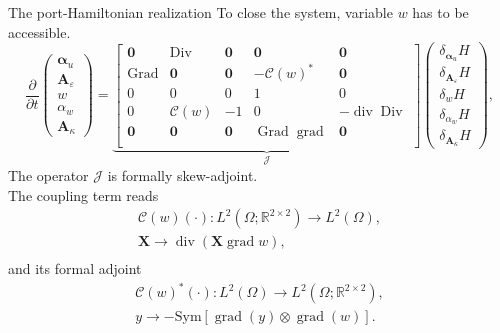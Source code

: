 \documentclass[aspectratio=169]{beamer}
\DeclareMathOperator*{\grad}{grad}
\DeclareMathOperator*{\Grad}{Grad}
\DeclareMathOperator*{\Div}{Div}
\renewcommand{\div}{\operatorname{div}}
\newcommand{\bbR}{\mathbb{R}}
\begin{document}
\begin{frame}{The port-Hamiltonian realization}
	To close the system, variable $w$ has to be accessible. 
	\begin{equation*}
	\frac{\partial}{\partial t}
	\begin{pmatrix}
		\bm{\alpha}_u \\
		\bm{A}_\varepsilon \\
		w \\
		\alpha_w \\
		\bm{A}_\kappa
	\end{pmatrix} = 
	\underbrace{\begin{bmatrix}
			\bm{0} & \Div & \bm{0} & \bm{0} & \bm{0}\\
			\Grad & \bm{0} & \bm{0} & -\mathcal{C}(w)^* & \bm{0} \\
			0 & 0 & 0 & 1 & 0 \\
			0 & \mathcal{C}(w) & -1 & 0 & -\div\Div \\
			\bm{0} & \bm{0} & \bm{0} & \Grad\grad & \bm{0} \\ 
	\end{bmatrix}}_{\mathcal{J}}
	\begin{pmatrix}
		\delta_{\bm\alpha_u} H \\
		\delta_{\bm{A}_\varepsilon} H \\
		\delta_{w} H \\
		\delta_{\alpha_w} H \\
		\delta_{\bm{A}_\kappa} H
	\end{pmatrix},
\end{equation*}
The operator $\mathcal{J}$ is formally skew-adjoint. \\
The coupling term reads
\begin{equation*}
	\begin{aligned}
		\mathcal{C}(w)(\cdot): L^2(\Omega; \bbR^{2\times 2}) \rightarrow L^2(\Omega), \\
								\bm{X}  \rightarrow \div( \bm{X} \grad w), \\
	\end{aligned} 
\end{equation*}
and its formal adjoint
\begin{equation*}
	\begin{aligned}
		\mathcal{C}(w)^*(\cdot): L^2(\Omega) \rightarrow L^2(\Omega; \bbR^{2\times 2}), \\
		y  \rightarrow  -\mathrm{Sym}\left[\grad (y) \otimes \grad(w)\right].
	\end{aligned}
\end{equation*}


\end{frame}
\end{document}
